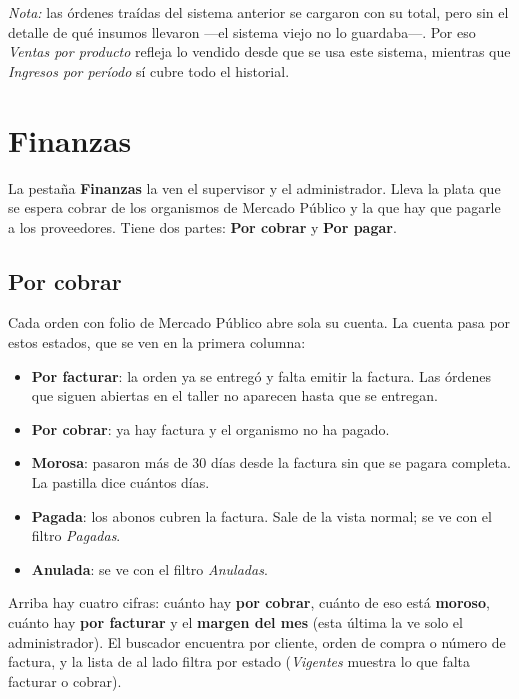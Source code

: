 \documentclass[11pt,a4paper]{article}
\begin{document}
\medskip
\noindent\emph{Nota:} las órdenes traídas del sistema anterior se cargaron con
su total, pero sin el detalle de qué insumos llevaron —el sistema viejo no lo
guardaba—. Por eso \emph{Ventas por producto} refleja lo vendido desde que se
usa este sistema, mientras que \emph{Ingresos por período} sí cubre todo el
historial.

\section{Finanzas}
\label{sec:finanzas}

La pestaña \textbf{Finanzas} la ven el supervisor y el administrador. Lleva la
plata que se espera cobrar de los organismos de Mercado Público y la que hay que
pagarle a los proveedores. Tiene dos partes: \textbf{Por cobrar} y \textbf{Por
pagar}.

\subsection{Por cobrar}


Cada orden con folio de Mercado Público abre sola su cuenta. La cuenta pasa por
estos estados, que se ven en la primera columna:

\begin{itemize}
  \item \textbf{Por facturar}: la orden ya se entregó y falta emitir la factura.
        Las órdenes que siguen abiertas en el taller no aparecen hasta que se
        entregan.
  \item \textbf{Por cobrar}: ya hay factura y el organismo no ha pagado.
  \item \textbf{Morosa}: pasaron más de 30 días desde la factura sin que se
        pagara completa. La pastilla dice cuántos días.
  \item \textbf{Pagada}: los abonos cubren la factura. Sale de la vista normal;
        se ve con el filtro \emph{Pagadas}.
  \item \textbf{Anulada}: se ve con el filtro \emph{Anuladas}.
\end{itemize}

Arriba hay cuatro cifras: cuánto hay \textbf{por cobrar}, cuánto de eso está
\textbf{moroso}, cuánto hay \textbf{por facturar} y el \textbf{margen del mes}
(esta última la ve solo el administrador). El buscador encuentra por cliente,
orden de compra o número de factura, y la lista de al lado filtra por estado
(\emph{Vigentes} muestra lo que falta facturar o cobrar).
\end{document}
